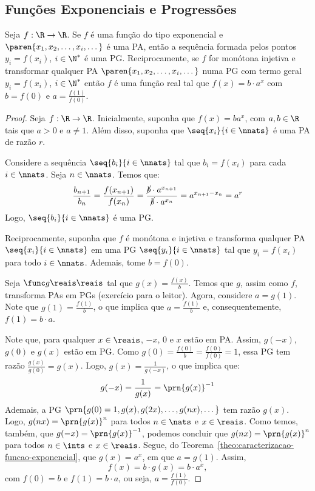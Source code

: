 \subsection{Funções Exponenciais e Progressões}

\begin{proposition}
Seja  $f: \R \to \R$. Se $f$ é uma função do tipo exponencial e
$\paren{x_1, x_2, \dots , x_i, \dots}$ é uma PA, então a sequência
formada pelos pontos $y_i = f(x_i)$, $i \in \N^*$ é uma PG.
Reciprocamente, se $f$ for monótona injetiva e transformar qualquer
PA $\paren{x_1, x_2, \dots , x_i, \dots}$ numa PG com termo geral
$y_i = f(x_i)$, $i \in \N^*$ então $f$ é uma função real tal
que $f(x) = b \cdot a^x$ com $b = f(0)$ e $a = \frac {f(1)} {f(0)}$.
\end{proposition}

\begin{proof}
    Seja $f: \R \to \R$. Inicialmente, suponha que $f(x) = b a^x$, com $a,b\in\R$ tais que $a>0$ e $a\ne 1$.
    Além disso, suponha que $\seq{x_i}{i \in \nnats}$ é uma PA de razão $r$.
    
    Considere a sequência $\seq{b_i}{i \in \nnats}$ tal que $b_i = f(x_i)$ para cada $i \in \nnats$.
    Seja $n \in \nnats$. Temos que:
    \[
        \frac{b_{n+1}}{b_n} = \frac{f(x_{n+1})}{f(x_n)} = \frac{\cancel b \cdot a^{x_{n+1}}}{\cancel b \cdot a^{x_n}} = 
        a^{x_{n+1}-x_n} = a^r
    \]
    Logo, $\seq{b_i}{i \in \nnats}$ é uma PG.

    Reciprocamente, suponha que $f$ é monótona e injetiva e transforma qualquer PA $\seq{x_i}{i \in \nnats}$
    em uma PG $\seq{y_i}{i \in \nnats}$ tal que $y_i = f(x_i)$ para todo $i \in \nnats$.
    Ademais, tome $b = f(0)$.

    Seja $\func g {\reais}{\reais}$ tal que $g(x) = \frac{f(x)}b$. 
    Temos que $g$, assim como $f$, transforma PAs em PGs (exercício para o leitor).
    Agora, considere $a = g(1)$. 
    Note que $g(1) = \frac{f(1)}b$, o que implica que $a = \frac{f(1)}b$ e, consequentemente,
    $f(1) = b\cdot a$. 
    
    Note que, para qualquer $x \in \reais$, $-x$, $0$ e $x$ estão em PA. 
    Assim, $g(-x)$, $g(0)$ e $g(x)$ estão em PG. 
    Como $g(0) = \frac{f(0)}{b} = \frac{f(0)}{f(0)} = 1$, essa PG tem razão
    $\frac{g(x)}{g(0)} = g(x)$.
    Logo, $g(x) = \frac{1}{g(-x)}$, o que implica que:
    \[
        g(-x) = \frac{1}{g(x)} = \prn{g(x)}^{-1}
    \]
    Ademais, a PG $\prn{g(0)=1, g(x), g(2x), \dots, g(nx), \dots}$ tem razão $g(x)$.
    Logo, $g(nx) = \prn{g(x)}^n$ para todos $n \in \nats$ e $x \in \reais$.
    Como temos, também, que $g(-x) = \prn{g(x)}^{-1}$, podemos concluir que
    $g(nx) = \prn{g(x)}^n$ para todos $n \in \ints$ e $x \in \reais$.
    Segue, do Teorema~\ref{theo:caracterizacao-funcao-exponencial}, que $g(x) = a^x$, 
    em que $a = g(1)$. Assim,
    \[
        f(x) = b\cdot g(x) = b \cdot a^x,
    \]
    com $f(0) = b$ e $f(1) = b\cdot a$, ou seja, $a = \frac{f(1)}{f(0)}$.


\end{proof}